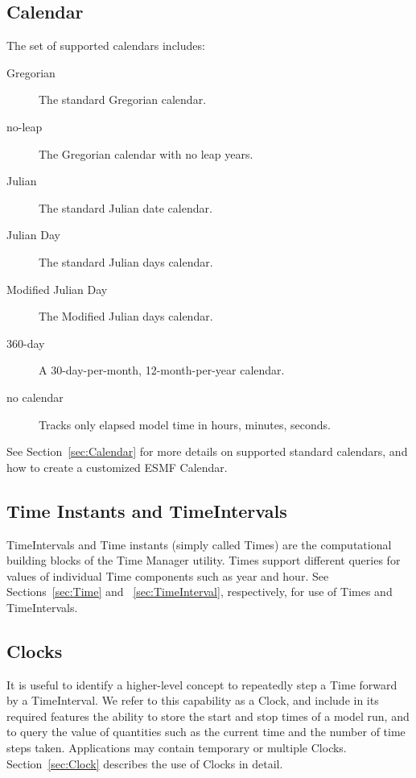 

\subsection{Calendar}
The set of supported calendars includes:
\begin{description}
\item [Gregorian] The standard Gregorian calendar.
\item [no-leap] The Gregorian calendar with no leap years.
\item [Julian] The standard Julian date calendar.
\item [Julian Day] The standard Julian days calendar.
\item [Modified Julian Day] The Modified Julian days calendar.
\item [360-day] A 30-day-per-month, 12-month-per-year calendar.
\item [no calendar] Tracks only elapsed model time in hours, minutes, seconds.
\end{description}
See Section~\ref{sec:Calendar} for more details on supported standard 
calendars, and how to create a customized ESMF Calendar.

\subsection{Time Instants and TimeIntervals}
\label{subsec:Time Instants and TimeIntervals}
TimeIntervals and Time instants (simply called Times) are the computational 
building blocks of the Time Manager utility.  Times support different queries 
for values of individual Time components such as year and hour.
See Sections~\ref{sec:Time} and ~\ref{sec:TimeInterval}, respectively, 
for use of Times and TimeIntervals.

\subsection{Clocks}
It is useful to identify a higher-level concept to repeatedly step a Time 
forward by a TimeInterval.  We refer to this capability as a Clock, and 
include in its required features the ability to store the start and stop times 
of a model run, and to query the value of quantities such as the current time 
and the number of time steps taken.  Applications may contain 
temporary or multiple Clocks. Section~\ref{sec:Clock} describes the use of 
Clocks in detail.
